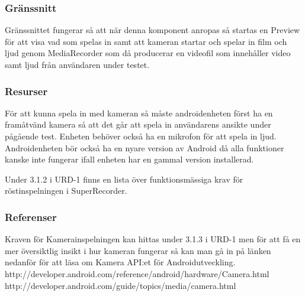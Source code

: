 \subsubsection{Gränssnitt}
Gränssnittet fungerar så att när denna komponent anropas så startas en Preview för att visa vad som spelas in samt att kameran startar och spelar in film och ljud genom MediaRecorder som då producerar en videofil som innehåller video samt ljud från användaren under testet.

\subsubsection{Resurser}
För att kunna spela in med kameran så måste androidenheten först ha en framåtvänd kamera så att det går att spela in användarens ansikte under pågående test. Enheten behöver också ha en mikrofon för att spela in ljud. Androidenheten bör också ha en nyare version av Android då alla funktioner kanske inte fungerar ifall enheten har en gammal version installerad.

Under 3.1.2 i URD-1 finns en lista över funktionsmässiga krav för röstinspelningen i SuperRecorder.

\subsubsection{Referenser}
Kraven för Kamerainspelningen kan hittas under 3.1.3 i URD-1 men för att få en mer översiktlig insikt i hur kameran fungerar så kan man gå in på länken nedanför för att läsa om Kamera API:et för Androidutveckling.
http://developer.android.com/reference/android/hardware/Camera.html
http://developer.android.com/guide/topics/media/camera.html

